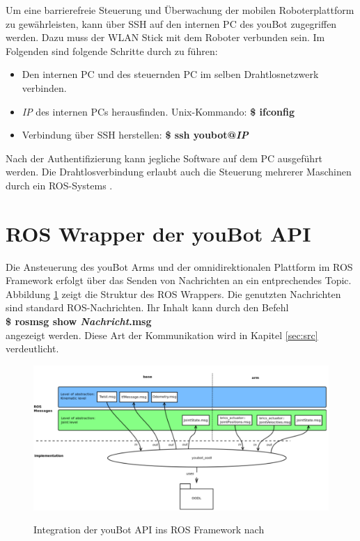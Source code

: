 \documentclass[9pt,a4paper,DIV=11]{scrartcl}
\begin{document}
Um eine barrierefreie Steuerung und Überwachung der mobilen Roboterplattform zu gewährleisten, kann über SSH auf den internen PC des youBot zugegriffen werden. Dazu muss der WLAN Stick mit dem Roboter verbunden sein.
Im Folgenden sind folgende Schritte durch zu führen:

\begin{itemize}
\item[1.] Den internen PC und des steuernden PC im selben Drahtlosnetzwerk verbinden.
\item[2.] \textit{IP} des internen PCs herausfinden. Unix-Kommando: \textbf{\$ ifconfig}
\item[3.] Verbindung über SSH herstellen: \textbf{\$ ssh youbot@\textit{IP}}
\end{itemize}

Nach der Authentifizierung kann jegliche Software auf dem PC ausgeführt werden. Die Drahtlosverbindung erlaubt auch die Steuerung mehrerer Maschinen durch ein ROS-Systems \cite{MULTIROS}.
\section{ROS Wrapper der youBot API}

Die Ansteuerung des youBot Arms und der omnidirektionalen Plattform im ROS Framework erfolgt über das Senden von Nachrichten an ein entprechendes Topic. Abbildung \ref{fig:msg} zeigt die Struktur des ROS Wrappers. Die genutzten Nachrichten sind standard ROS-Nachrichten. Ihr Inhalt kann durch den Befehl \\

\textbf{\$ rosmsg show \textit{Nachricht}.msg} \\

angezeigt werden. Diese Art der Kommunikation wird in Kapitel \ref{sec:src} verdeutlicht.

\begin{figure}[H]
\centering
	\includegraphics[width=\textwidth]{./files/oodl_ros.jpg}
\label{fig:msg}
\caption{Integration der youBot API ins ROS Framework nach \citep{YBUSER}}
\end{figure}
\end{document}
